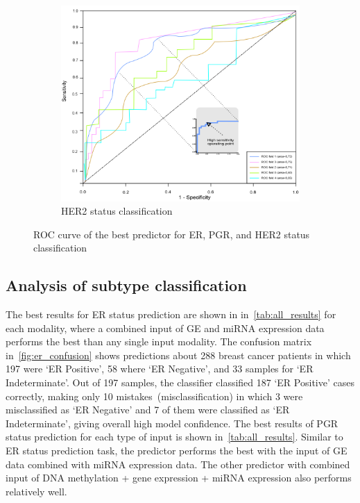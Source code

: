 \begin{figure}
\begin{subfigure}{0.49\linewidth}
		\includegraphics[width=0.9\linewidth]{images/roc_her2.png}
		\caption{HER2 status classification }
        \label{fig:her2_roc}
	\end{subfigure}
	\caption{ROC curve of the best predictor for ER, PGR, and HER2 status classification~\cite{karimACCESS2019}} 
	\label{fig:roc_all}
\end{figure}
\fi 

\subsection{Analysis of subtype classification}
The best results for ER status prediction are shown in in~\cref{tab:all_results} for each modality, where a combined input of GE and miRNA expression data performs the best than any single input modality. The confusion matrix in~\cref{fig:er_confusion} shows predictions about 288 breast cancer patients in which 197 were `ER Positive', 58 where `ER Negative', and 33 samples for `ER Indeterminate'. Out of 197 samples, the classifier classified 187 `ER Positive' cases correctly, making only 10 mistakes~(misclassification) in which 3 were misclassified as `ER Negative' and 7 of them were classified as `ER Indeterminate', giving overall high model confidence. 
The best results of PGR status prediction for each type of input is shown in~\cref{tab:all_results}. Similar to ER status prediction task, the predictor performs the best with the input of GE data combined with miRNA expression data. The other predictor with combined input of DNA methylation + gene expression + miRNA expression also performs relatively well. 


